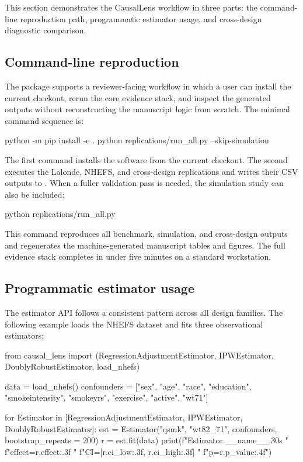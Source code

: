 \documentclass[article]{jss}
\begin{document}
This section demonstrates the CausalLens workflow in three parts: the
command-line reproduction path, programmatic estimator usage, and
cross-design diagnostic comparison.

\subsection{Command-line reproduction}\label{sec:cmdline}

The package supports a reviewer-facing workflow in which a user
can install the current checkout, rerun the core evidence stack, and inspect
the generated outputs without reconstructing the manuscript logic from
scratch. The minimal command sequence is:

\begin{Code}
python -m pip install -e .
python replications/run_all.py --skip-simulation
\end{Code}

The first command installs the software from the current checkout. The second
executes the Lalonde, NHEFS, and cross-design replications and writes their
CSV outputs to . When a fuller validation pass is
needed, the simulation study can also be included:

\begin{Code}
python replications/run_all.py
\end{Code}

This command reproduces all benchmark, simulation, and cross-design outputs
and regenerates the machine-generated manuscript tables and figures. The full
evidence stack completes in under five minutes on a standard workstation.

\subsection{Programmatic estimator usage}\label{sec:api}

The estimator API follows a consistent pattern across all design families.
The following example loads the NHEFS dataset and fits three observational
estimators:

\begin{Code}
from causal_lens import (RegressionAdjustmentEstimator,
    IPWEstimator, DoublyRobustEstimator, load_nhefs)

data = load_nhefs()
confounders = ["sex", "age", "race", "education",
    "smokeintensity", "smokeyrs", "exercise",
    "active", "wt71"]

for Estimator in [RegressionAdjustmentEstimator,
                  IPWEstimator, DoublyRobustEstimator]:
    est = Estimator("qsmk", "wt82_71", confounders,
                    bootstrap_repeats = 200)
    r = est.fit(data)
    print(f"{Estimator.__name__:30s}  "
          f"effect={r.effect:.3f}  "
          f"CI=[{r.ci_low:.3f}, {r.ci_high:.3f}]  "
          f"p={r.p_value:.4f}")
\end{Code}
\end{document}
